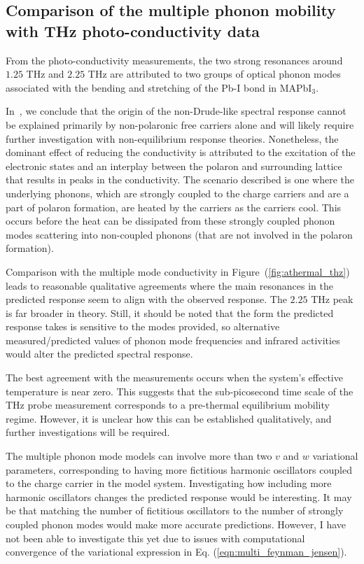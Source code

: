 \subsection{Comparison of the multiple phonon mobility with THz photo-conductivity data}

From the photo-conductivity measurements, the two strong resonances around $1.25$ THz and $2.25$ THz are attributed to two groups of optical phonon modes associated with the bending and stretching of the Pb-I bond in MAPbI$_3$. 

In~\cite{zheng_multipulse_2021}, we conclude that the origin of the non-Drude-like spectral response cannot be explained primarily by non-polaronic free carriers alone and will likely require further investigation with non-equilibrium response theories. Nonetheless, the dominant effect of reducing the conductivity is attributed to the excitation of the electronic states and an interplay between the polaron and surrounding lattice that results in peaks in the conductivity. The scenario described is one where the underlying phonons, which are strongly coupled to the charge carriers and are a part of polaron formation, are heated by the carriers as the carriers cool. This occurs before the heat can be dissipated from these strongly coupled phonon modes scattering into non-coupled phonons (that are not involved in the polaron formation). 

Comparison with the multiple mode conductivity in Figure~(\ref{fig:athermal_thz}) leads to reasonable qualitative agreements where the main resonances in the predicted response seem to align with the observed response. The $2.25$ THz peak is far broader in theory. Still, it should be noted that the form the predicted response takes is sensitive to the modes provided, so alternative measured/predicted values of phonon mode frequencies and infrared activities would alter the predicted spectral response. 

The best agreement with the measurements occurs when the system's effective temperature is near zero. This suggests that the sub-picosecond time scale of the THz probe measurement corresponds to a pre-thermal equilibrium mobility regime. However, it is unclear how this can be established qualitatively, and further investigations will be required. 

The multiple phonon mode models can involve more than two $v$ and $w$ variational parameters, corresponding to having more fictitious harmonic oscillators coupled to the charge carrier in the model system. Investigating how including more harmonic oscillators changes the predicted response would be interesting. It may be that matching the number of fictitious oscillators to the number of strongly coupled phonon modes would make more accurate predictions. However, I have not been able to investigate this yet due to issues with computational convergence of the variational expression in Eq. (\ref{eqn:multi_feynman_jensen}).

